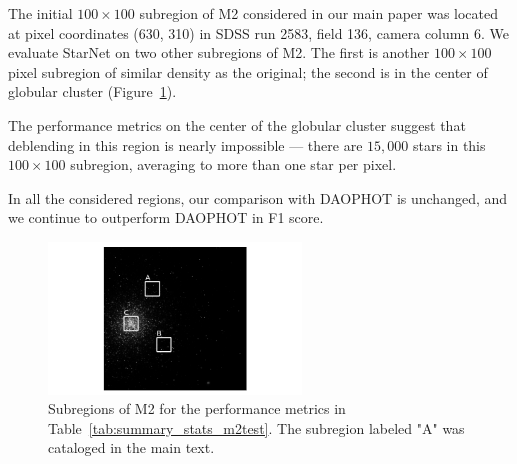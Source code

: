 
The initial $100\times100$ subregion of M2 considered in our main paper was located at pixel coordinates (630, 310) in SDSS run 2583, field 136, camera column 6. 
We evaluate StarNet on two other subregions of M2.
The first is another $100\times100$ pixel subregion of similar density as the original;
the second is in the center of globular cluster
(Figure~\ref{fig:m2_test_regions}).

The performance metrics on the center of the globular cluster 
suggest that deblending in this region is nearly impossible --- there are $15,000$ stars in this $100\times100$ subregion, 
averaging to more than one star per pixel. 

In all the considered regions, our comparison with DAOPHOT is unchanged, and we continue to outperform DAOPHOT in F1 score. 

\begin{figure}[tb]
    \centering
    \includegraphics[width=0.6\textwidth]{figures/m2_results/test_images.png}
    \caption{Subregions of M2 for the performance metrics in Table~\ref{tab:summary_stats_m2test}. The subregion labeled "A" was cataloged in the main text. 
}
    \label{fig:m2_test_regions}
\end{figure}




